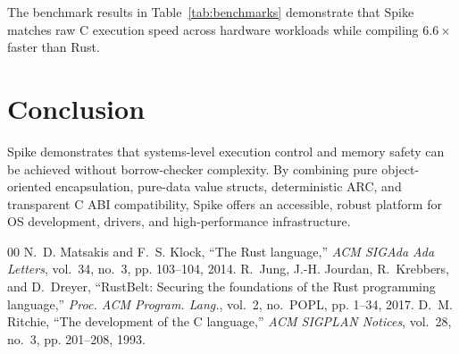 \documentclass[10pt,twocolumn]{article}
\begin{document}
The benchmark results in Table~\ref{tab:benchmarks} demonstrate that Spike matches raw C execution speed across hardware workloads while compiling $6.6\times$ faster than Rust.

\section{Conclusion}
Spike demonstrates that systems-level execution control and memory safety can be achieved without borrow-checker complexity. By combining pure object-oriented encapsulation, pure-data value structs, deterministic ARC, and transparent C ABI compatibility, Spike offers an accessible, robust platform for OS development, drivers, and high-performance infrastructure.

\begin{thebibliography}{00}
 N.~D. Matsakis and F.~S. Klock, ``The Rust language,'' \emph{ACM SIGAda Ada Letters}, vol.~34, no.~3, pp. 103--104, 2014.
 R.~Jung, J.-H. Jourdan, R.~Krebbers, and D.~Dreyer, ``RustBelt: Securing the foundations of the Rust programming language,'' \emph{Proc. ACM Program. Lang.}, vol.~2, no.~POPL, pp. 1--34, 2017.
 D.~M. Ritchie, ``The development of the C language,'' \emph{ACM SIGPLAN Notices}, vol.~28, no.~3, pp. 201--208, 1993.
\end{thebibliography}
\end{document}
